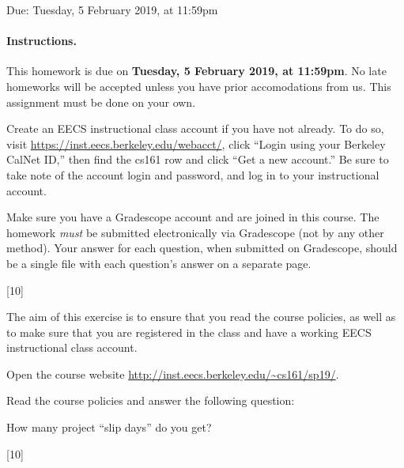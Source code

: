 \documentclass[12pt]{exam}
\newcommand{\solbox}[2]{%
\fbox{%
\parbox[c][#1][t]{\dimexpr\linewidth-2\fboxsep-2\fboxrule}{
  \hrule width \hsize height 0pt
  #2
 }%
}%
\par\vspace{\ht\strutbox}
}
\newcommand{\textfield}[3]{%
\iftoggle{pdfform}{%
\TextField[name = #1, backgroundcolor=white, height=#2,
width = \linewidth, multiline=true]{\mbox}%
}{%
\ifprintanswers\else{%
    \solbox{#2}{#3}}
\fi%
}%
}
\newcommand{\includesolution}[1]{%
\IfFileExists{solutions/#1.tex}{%
\begin{solution}%
%
\end{solution}%
}{}
}
\def\duedate{Tuesday, 5 February 2019}
\begin{document}
\begin{Form}

\begin{center}
  \large
  Due: \duedate, at 11:59pm
\end{center}

\paragraph{Instructions.}
This homework is due on \textbf{\duedate, at 11:59pm}. No late homeworks will be accepted unless you have prior accomodations from us.
This assignment must be done on your own.

Create an EECS instructional class account if you have not already. To do so,
visit \url{https://inst.eecs.berkeley.edu/webacct/}, click ``Login
using your Berkeley CalNet ID,'' then find the cs161 row and click ``Get a new
account.'' Be sure to take note of the account login and password, and log in to
your instructional account.

Make sure you have a Gradescope account and are joined in this course.  The
homework \emph{must} be submitted electronically via Gradescope (not by
any other method).  Your answer for each question,
when submitted on Gradescope, should be a
single file with each question's answer on a separate page.

\begin{questions}
[10]

The aim of this exercise is to ensure that you read the course policies, as
well as to make sure that you are registered in the class and have a working
EECS instructional class account.

Open the course website \url{http://inst.eecs.berkeley.edu/~cs161/sp19/}.

Read the course policies and answer the following question:

How many project ``slip days'' do you get?

\textfield{Q1}{0.5cm}{
    0
}

\vspace{0.12em}

\includesolution{sol1}

\newpage
[10]


\end{questions}
\end{Form}
\end{document}
